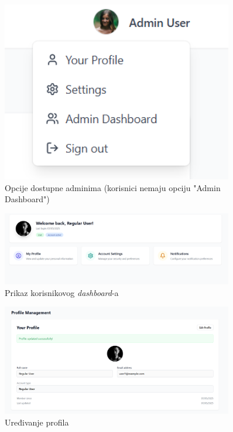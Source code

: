 \begin{figure}[H]
    \centering
    \includegraphics[width=0.9\textwidth]{Slike/fz3.8.png}
    \caption{Opcije dostupne adminima (korisnici nemaju opciju "Admin Dashboard")}
    \label{fig:fz3.8}
\end{figure}

\begin{figure}[H]
    \centering
    \includegraphics[width=0.9\textwidth]{Slike/fz3.9.png}
    \caption{Prikaz korisnikovog \textit{dashboard}-a}
    \label{fig:fz3.9}
\end{figure}

\begin{figure}[H]
    \centering
    \includegraphics[width=0.9\textwidth]{Slike/fz3.10.png}
    \caption{Uređivanje profila}
    \label{fig:fz3.10}
\end{figure}


